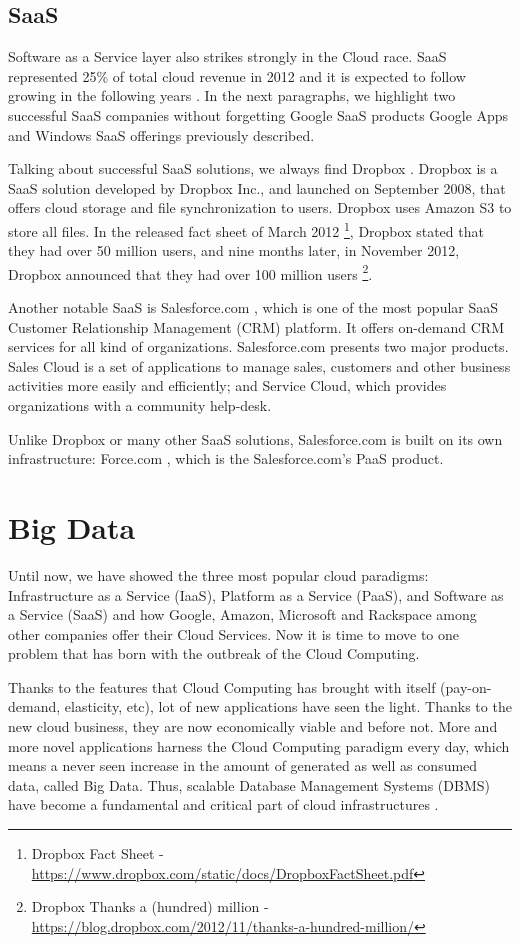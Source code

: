 \subsection{SaaS}
Software as a Service layer also strikes strongly in the Cloud race. SaaS represented 25\% of total cloud revenue in 2012 and it is expected to follow growing in the following years \cite{aslett2013451}. In the next paragraphs, we highlight two successful SaaS companies without forgetting Google SaaS products Google Apps and Windows SaaS offerings previously described.
\par
Talking about successful SaaS solutions, we always find Dropbox \cite{Dropbox}. Dropbox is a SaaS solution developed by Dropbox Inc., and launched on September 2008, that offers cloud storage and file synchronization to users. Dropbox uses Amazon S3 to store all files. 
In the released fact sheet of March 2012 \footnote{Dropbox {F}act {S}heet - \url{https://www.dropbox.com/static/docs/DropboxFactSheet.pdf}}, Dropbox stated that they had over 50 million users, and nine months later, in November 2012, Dropbox announced that they had over 100 million users \footnote{Dropbox {T}hanks a (hundred) million - \url{https://blog.dropbox.com/2012/11/thanks-a-hundred-million/}}.
\par
Another notable SaaS is Salesforce.com \cite{Salesforce.com}, which is one of the most popular SaaS Customer Relationship Management (CRM) platform. It offers on-demand CRM services for all kind of organizations. Salesforce.com presents two major products. Sales Cloud is a set of applications to manage sales, customers and other business activities more easily and efficiently; and Service Cloud, which provides organizations with a community help-desk.
\par
Unlike Dropbox or many other SaaS solutions, Salesforce.com is built on its own infrastructure: Force.com \cite{Force.com}, which is the Salesforce.com's PaaS product.


\section{Big Data}


Until now, we have showed the three most popular cloud paradigms: Infrastructure as a Service (IaaS), Platform as a Service (PaaS), and Software as a Service (SaaS) and how Google, Amazon, Microsoft and Rackspace among other companies offer their Cloud Services. Now it is time to move to one problem that has born with the outbreak of the Cloud Computing.
\par
Thanks to the features that Cloud Computing has brought with itself (pay-on-demand, elasticity, etc), lot of new applications have seen the light. Thanks to the new cloud business, they are now economically viable and before not. More and more novel applications harness the Cloud Computing paradigm every day, which means a never seen increase in the amount of generated as well as consumed data, called Big Data. Thus, scalable Database Management Systems (DBMS) have become a fundamental and critical part of cloud infrastructures \cite{agrawal2010big}.

